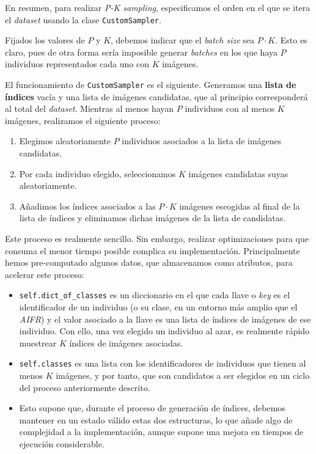 En resumen, para realizar \textit{P-K sampling}, especificamos el orden en el que se itera el \textit{dataset} usando la clase \lstinline{CustomSampler}.

Fijados los valores de $P$ y $K$, debemos indicar que el \textit{batch size} sea $P \cdot K$. Esto es claro, pues de otra forma sería imposible generar \textit{batches} en los que haya $P$ individuos representados cada uno con $K$ imágenes.

El funcionamiento de \lstinline{CustomSampler} es el siguiente. Generamos una \textbf{lista de índices} vacía y una lista de imágenes candidatas, que al principio corresponderá al total del \textit{dataset}. Mientras al menos hayan $P$ individuos con al menos $K$ imágenes, realizamos el siguiente proceso:

\begin{enumerate}
	\item Elegimos aleatoriamente $P$ individuos asociados a la lista de imágenes candidatas.
	\item Por cada individuo elegido, seleccionamos $K$ imágenes candidatas suyas aleatoriamente.
	\item Añadimos los índices asociados a las $P \cdot K$ imágenes escogidas al final de la lista de índices y eliminamos dichas imágenes de la lista de candidatas.
\end{enumerate}

Este proceso es realmente sencillo. Sin embargo, realizar optimizaciones para que consuma el menor tiempo posible complica su implementación. Principalmente hemos pre-computado algunos datos, que almacenamos como atributos, para acelerar este proceso:

\begin{itemize}
	\item \lstinline{self.dict_of_classes} es un diccionario en el que cada llave o \textit{key} es el identificador de un individuo (o su clase, en un entorno más amplio que el \textit{AIFR}) y el valor asociado a la llave es una lista de índices de imágenes de ese individuo. Con ello, una vez elegido un individuo al azar, es realmente rápido muestrear $K$ índices de imágenes asociadas.
	\item \lstinline{self.classes} es una lista con los identificadores de individuos que tienen al menos $K$ imágenes, y por tanto, que son candidatos a ser elegidos en un ciclo del proceso anteriormente descrito.
	\item Esto supone que, durante el proceso de generación de índices, debemos mantener en un estado válido estas dos estructuras, lo que añade algo de complejidad a la implementación, aunque supone una mejora en tiempos de ejecución considerable.
\end{itemize}

